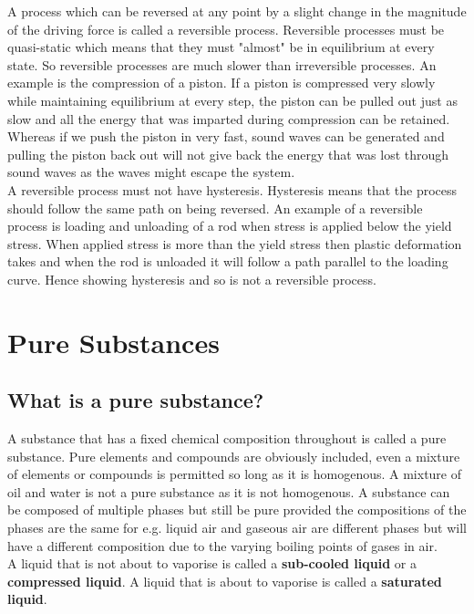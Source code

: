 \documentclass[12pt]{article}
\begin{document}
    A process which can be reversed at any point by a slight change in the magnitude of the driving force is called a reversible process. Reversible processes must be quasi-static which means that they must "almost" be in equilibrium at every state. So reversible processes are much slower than irreversible processes. An example is the compression of a piston. If a piston is compressed very slowly while maintaining equilibrium at every step, the piston can be pulled out just as slow and all the energy that was imparted during compression can be retained. Whereas if we push the piston in very fast, sound waves can be generated and pulling the piston back out will not give back the energy that was lost through sound waves as the waves might escape the system. \\
    
    A reversible process must not have hysteresis. Hysteresis means that the process should follow the same path on being reversed. An example of a reversible process is loading and unloading of a rod when stress is applied below the yield stress. When applied stress is more than the yield stress then plastic deformation takes and when the rod is unloaded it will follow a path parallel to the loading curve. Hence showing hysteresis and so is not a reversible process. \\
    \pagebreak
    
\section{Pure Substances}
    \subsection{What is a pure substance?}
    A substance that has a fixed chemical composition throughout is called a pure substance. Pure elements and compounds are obviously included, even a mixture of elements or compounds is permitted so long as it is homogenous. A mixture of oil and water is not a pure substance as it is not homogenous. A substance can be composed of multiple phases but still be pure provided the compositions of the phases are the same for e.g. liquid air and gaseous air are different phases but will have a different composition due to the varying boiling points of gases in air.\\
    
    A liquid that is not about to vaporise is called a \textbf{sub-cooled liquid} or a \textbf{compressed liquid}. A liquid that is about to vaporise is called a \textbf{saturated liquid}.
\end{document}
